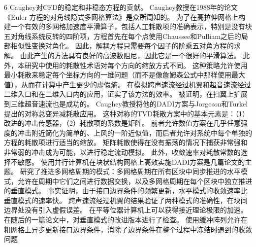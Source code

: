 \documentclass[UTF8,11pt,a4paper,openany,fontset=fandol]{ctexbook}
\begin{document}
6 Caughey对CFD的稳定和非稳态方程的贡献。 Caughey教授在1988年的论文《Euler 方程的对角线隐式多网格算法》是众所周知的。 为了在高拉伸网格上构建一个有效的多网格加速度平滑算子，包括人工耗散项的准确表示，特别是没有块五对角线系统反转的四阶项，方程首先在每个点使用Chaussee和Pulliam之后的局部相似性变换对角化。 因此，解耦方程只需要每个因子的阶乘五对角方程的求解。 由此产生的方法具有良好的高波数阻尼，因此它是一个很好的平滑算法。 此外，本研究中使用的耗散性术语对每个方向的缩放方式不同。 这种策略允许使用最小耗散来稳定每个坐标方向的一维问题（而不是像詹姆森公式中那样使用最大值），从而在计算中产生更少的虚假熵。 在模拟跨声速流经过机翼和超音速流经过二维入口和在二维入口内的应用，证实了该方法的效率。 被证明，在扫翼上扩展到三维超音速流也是成功的。 Caughey教授将他的DADI方案与Jorgeson和Turkel提出的对称总变异减耗散应用。 这种对称的TVD耗散方案中的基本元素是：（1）改进的冲击传感器，（2）耗散项的系数是矩阵。 前者允许数值方案在几乎任意强度的冲击附近简化为简单的、上风的一阶近似值，而后者允许对系统中每个单独的方程的耗散项进行适当的缩放。 矩阵耗散使得在没有振荡的情况下捕获非常强和非常弱的冲击成为可能，以进行稳定流动模拟。 此外，收敛速率对耗散常数的选择不敏感。 使用并行计算机在块状结构网格上高效实施DADI方案是几篇论文的主题。 研究了推进多网格周期的模式：多网格周期在所有区块中同步推进的水平模式，允许在周期中它们之间进行数据交换，以及多网格周期在每个区块中独立推进的垂直模式。 事实证明，由于接口边界条件的频繁更新，水平模式的收敛速率比垂直模式的速率快。 跨声速流经过机翼的结果验证了两种模式的准确性，在块间边界处没有引入虚假误差。 在平等位器计算机上可以获得接近理论极限的加速。 在随后的一篇论文中，对垂直模式的改进版本进行了检查。 使用缓冲阵列允许在粗网格上异步更新接口边界条件，消除了边界条件在整个过程中冻结时遇到的收敛问题
\end{document}
